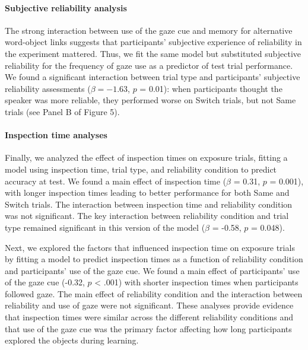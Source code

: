 \documentclass[authoryear, review]{elsarticle}
\begin{document}
\paragraph{Subjective reliability
analysis}\label{subjective-reliability-analysis}

The strong interaction between use of the gaze cue and memory for
alternative word-object links suggests that participants' subjective
experience of reliability in the experiment mattered. Thus, we fit the
same model but substituted subjective reliability for the frequency of
gaze use as a predictor of test trial performance. We found a
significant interaction between trial type and participants' subjective
reliability assessments (\(\beta = -1.63\), \(p\) = 0.01): when
participants thought the speaker was more reliable, they performed worse
on Switch trials, but not Same trials (see Panel B of Figure 5).

\paragraph{Inspection time analyses}\label{inspection-time-analyses}

Finally, we analyzed the effect of inspection times on exposure trials,
fitting a model using inspection time, trial type, and reliability
condition to predict accuracy at test. We found a main effect of
inspection time (\(\beta\) = 0.31, \(p\) = 0.001), with longer
inspection times leading to better performance for both Same and Switch
trials. The interaction between inspection time and reliability
condition was not significant. The key interaction between reliability
condition and trial type remained significant in this version of the
model (\(\beta\) = -0.58, \(p\) = 0.048).

Next, we explored the factors that influenced inspection time on
exposure trials by fitting a model to predict inspection times as a
function of reliability condition and participants' use of the gaze cue.
We found a main effect of participants' use of the gaze cue (-0.32,
\(p\) \textless{} .001) with shorter inspection times when participants
followed gaze. The main effect of reliability condition and the
interaction between reliability and use of gaze were not significant.
These analyses provide evidence that inspection times were similar
across the different reliability conditions and that use of the gaze cue
was the primary factor affecting how long participants explored the
objects during learning.
\end{document}
